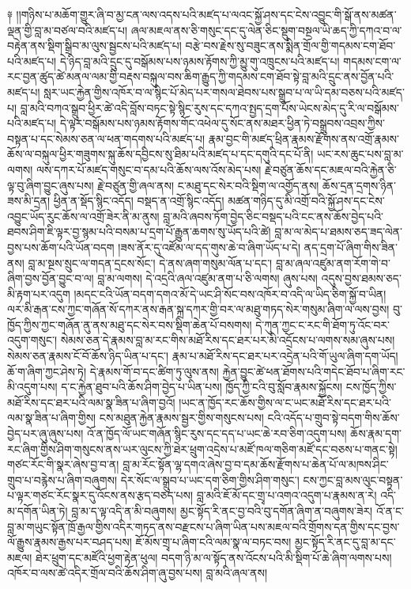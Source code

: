 \documentclass{article}
\begin{document}
༈ །།གཉིས་པ་མཆོག་གྱུར་ཞི་བ་མྱ་ངན་ལས་འདས་པའི་མཛད་པ་ལའང་སྐྱོ་ཤས་དང་ངེས་འབྱུང་གི་སྒོ་ནས་མཚན་ལྡན་གྱི་བླ་མ་བཙལ་བའི་མཛད་པ། ཞལ་མཇལ་ནས་ཅི་གསུང་དང་དུ་ལེན་ཅིང་སྡུག་བསྔལ་ཡི་ཆད་ཀྱི་དཀའ་བ་ལ་བརྟེན་ནས་སྡིག་སྒྲིབ་མ་ལུས་སྦྱངས་པའི་མཛད་པ། བརྩེ་བས་རྗེས་སུ་བཟུང་ནས་སྨིན་གྲོལ་གྱི་གདམས་ངག་ཐོབ་པའི་མཛད་པ། དེ་ཉིད་བླ་མའི་དྲུང་དུ་བསྒོམས་པས་ཉམས་རྟོགས་ཀྱི་མྱུ་གུ་འཁྲུངས་པའི་མཛད་པ། གདམས་ངག་ལ་རང་བྱན་ཚུད་ཚེ་མནལ་ལམ་གྱི་བརྡས་བསྐུལ་བས་ཆིག་རྒྱུད་ཀྱི་གདམས་ངག་ཐོབ་སྟེ་བླ་མའི་དྲུང་ནས་བྱོན་པའི་མཛད་པ། སླར་ཡང་རྐྱེན་གྱིས་འཁོར་བ་ལ་སྙིང་པོ་མེད་པར་གསལ་ཐེབས་པས་སྒྲུབ་པ་ལ་ཡི་དམ་བཅས་པའི་མཛད་པ། བླ་མའི་བཀའ་སྒྲུབ་ཕྱིར་ཚེ་འདི་བློས་བཏང་སྟེ་སྙིང་རུས་དང་དཀའ་སྤྱད་དྲག་པོས་ཡེངས་མེད་དུ་རི་ལ་བསྒོམས་པའི་མཛད་པ། དེ་ལྟར་བསྒོམས་པས་ཉམས་རྟོགས་གོང་འཕེལ་དུ་སོང་ནས་མཐར་ཕྱིན་ཏེ་བསྒྲུབས་འབྲས་ཀྱིས་བསྟན་པ་དང་སེམས་ཅན་ལ་ཕན་གདགས་པའི་མཛད་པ། རྣམ་བྱང་གི་མཛད་ཕྲིན་རྣམས་རྫོགས་ནས་འགྲོ་རྣམས་ཆོས་ལ་བསྐུལ་ཕྱིར་གཟུགས་སྐུ་ཆོས་དབྱིངས་སུ་ཐིམ་པའི་མཛད་པ་དང་དགུའི་དང་པོ་ནི། ཡང་རས་ཆུང་པས་བླ་མ་ལགས། ལས་དཀར་པོ་མཛད་གསུང་བ་དམ་པའི་ཆོས་ལས་འོས་མེད་པས། རྗེ་བཙུན་ཆོས་དང་མཇལ་བའི་རྐྱེན་ཅི་ལྟ་བུ་ཞིག་བྱུང་ཞུས་པས། རྗེ་བཙུན་གྱི་ཞལ་ནས། ང་མཐུ་དང་སེར་བའི་སྡིག་ལ་འགྱོད་ནས། ཆོས་དྲན་དྲགས་ཉིན་ཟས་མི་དྲན། ཕྱིན་ན་སྡོད་སྙིང་འདོད། བསྡད་ན་འགྲོ་སྙིང་འདོད། མཚན་གཉིད་དུ་མི་འགྲོ་བའི་སྐྱོ་ཤས་དང་ངེས་འབྱུང་ཡོད་རུང་ཆོས་ལ་འགྲོ་ཟེར་ནི་མ་ནུས། བླ་མའི་ཞབས་ཏོག་བྱེད་ཅིང་བསྡད་པའི་ངང་ནས་ཆོས་བྱེད་པའི་ཐབས་ཤིག་ཇི་ལྟར་བྱ་སྙམ་པའི་བསམ་པ་དྲག་པོ་རྒྱུན་ཆགས་སུ་ཡོད་པའི་ཚེ། བླ་མ་ལ་མེད་པ་ཐམས་ཅད་ཟད་ལེན་བྱས་པས་ཆོག་པའི་ཡོན་བདག །ཟས་ནོར་དུ་འཛོམ་ལ་དད་གུས་ཆེ་བ་ཞིག་ཡོད་པ་དེ། ནད་དྲག་པོ་ཞིག་གིས་ཟིན་ནས། བླ་མ་སྔས་སྲུང་ལ་གདན་དྲངས་སོང་། དེ་ནས་ཞག་གསུམ་ལོན་པ་དང་། བླ་མ་ཞལ་འཛུམ་ནག་རོག་གེ་བ་ཞིག་བྱས་བྱོན་བྱུང་བ་ལ། བླ་མ་ལགས། དེ་འདྲའི་ཞལ་འཛུམ་ནག་པ་ཅི་ལགས། ཞུས་པས། འདུས་བྱས་ཐམས་ཅད་མི་རྟག་པར་འདུག །མདང་ངའི་ཡོན་བདག་དགའ་མོ་དེ་ཡང་ཤི་སོང་བས་འཁོར་བ་འདི་ལ་ཡིད་ཅིག་སྐྱོ་བ་ཡིན། ལར་མི་རྒན་ངས་ཀྱང་གཞོན་སོ་དཀར་ནས་རྒན་སྐྲ་དཀར་གྱི་བར་ལ་མཐུ་གཏད་སེར་གསུམ་ཞིག་ལ་ལས་བྱས། བུ་ཁྱོད་ཀྱིས་ཀྱང་གཞོན་ནུ་ནས་མཐུ་དང་སེར་བས་སྡིག་ཆེན་པོ་བསགས། དེ་ཀུན་ཀྱང་ང་རང་གི་ཐོག་ཏུ་འོང་བར་འདུག་གསུང་། སེམས་ཅན་དེ་རྣམས་བླ་མ་རང་གིས་མཐོ་རིས་དང་ཐར་པར་མི་འདྲོངས་པ་ལགས་སམ་ཞུས་པས། སེམས་ཅན་རྣམས་ངོ་བོ་ཆོས་ཉིད་ཡིན་པ་དང་། རྣམ་པ་མཐོ་རིས་དང་ཐར་པར་འདྲེན་པའི་གོ་ཡུལ་ཞིག་དག་ཡོད། ཆོ་ག་ཞིག་ཀྱང་ཤེས་ཏེ། དེ་རྣམས་གོ་བ་དང་ཚིག་ཏུ་ལུས་ནས། རྐྱེན་བྱུང་ཚེ་ཕན་ཐོགས་པའི་གདེང་ཐོབ་པ་ཞིག་རང་མི་འདུག་པས། ད་ང་རྐྱེན་ཐུབ་པའི་ཆོས་ཤིག་བྱེད་པ་ཡིན་པས། ཁྱོད་ཀྱི་ངའི་བུ་སློབ་རྣམས་སྐྱོངས། ངས་ཁྱོད་ཀྱིས་མཐོ་རིས་དང་ཐར་པའི་ལམ་སྣ་ཟིན་པ་ཞིག་བྱའོ། །ཡང་ན་ཁྱོད་རང་ཆོས་གྱིས་ལ་ང་ཡང་མཐོ་རིས་དང་ཐར་པའི་ལམ་སྣ་ཟིན་པ་ཞིག་གྱིས། ངས་མཐུན་རྐྱེན་རྣམས་སྦྱར་གྱིས་གསུངས་པས། ངའི་འདོད་པ་གྲུབ་སྟེ་བདག་གིས་ཆོས་བྱེད་པར་ཞུ་ཞུས་པས། འོ་ན་ཁྱོད་ལོ་ཡང་གཞོན་སྙིང་རུས་དང་དད་པ་ཡང་ཆེ་རབ་ཅིག་འདུག་པས། ཆོས་རྣམ་དག་རང་ཞིག་གྱིས་ཤིག་གསུངས་ནས་ཡར་ལུངས་ཀྱི་ཐེར་ཕྲུག་འདྲེས་པ་མཛོ་ཁལ་གཅིག་མཛོ་དང་བཅས་པ་གནང་སྟེ། གཙང་རོང་གི་སྣར་ཞེས་བྱ་བ་ན། བླ་མ་རོང་སྟོན་ལྷ་དགའ་ཞེས་བྱ་བ་དམ་ཆོས་རྫོགས་པ་ཆེན་པོ་ལ་མཁས་ཤིང་གྲུབ་པ་བརྙེས་པ་ཞིག་བཞུགས། དེར་སོང་ལ་སྒྲུབ་པ་ཡང་དག་ཅིག་གྱིས་ཤིག་གསུང་། ངས་ཀྱང་བླ་མས་ལུང་བསྟན་པ་ལྟར་གཙང་རོང་སྣར་དུ་འོངས་ནས་རྩད་བཅད་པས། བླ་མའི་ཇོ་མོ་དང་གྲྭ་པ་འགའ་འདུག་པ་རྣམས་ན་རེ། འདི་མ་དགོན་ཡིན་ཏེ། བླ་མ་ད་ལྟ་འདི་ན་མི་བཞུགས། མྱང་སྟོད་རི་ནང་བྱ་བའི་བུ་དགོན་ཞིག་ན་བཞུགས་ཟེར། འོ་ན་ང་བླ་མ་གཡུང་སྟོན་ཁྲོ་རྒྱལ་གྱིས་འདིར་གཏད་ནས་བརྫངས་པ་ཞིག་ཡིན་པས་མཇལ་བའི་གྲོགས་དན་གྱིས་དང་བྱས་ལོ་རྒྱུས་རྣམས་རྒྱས་པར་བཤད་པས། ཇོ་མོས་གྲྭ་པ་ཞིག་ངའི་ལམ་སྣ་ལ་བཏང་བས། མྱང་སྟོད་རི་ནང་དུ་བླ་མ་དང་མཇལ། ཐེར་ཕྲུག་དང་མཛོའི་ཕྱག་རྟེན་ཕུལ། བདག་ཉི་མ་ལ་སྟོད་ནས་འོངས་པའི་མི་སྡིག་པོ་ཆེ་ཞིག་ལགས་པས། འཁོར་བ་ལས་ཚེ་འདིར་གྲོལ་བའི་ཆོས་ཤིག་ཞུ་བྱས་པས། བླ་མའི་ཞལ་ནས། 
\end{document}
